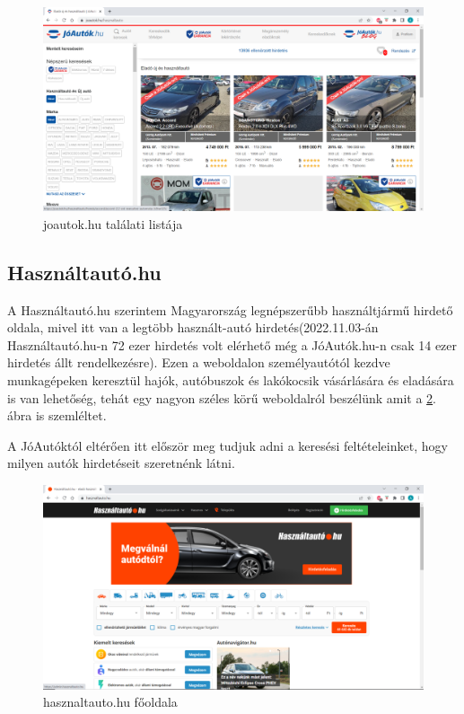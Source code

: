 \begin{figure}[h]
\centering
\includegraphics[scale=1]{images/joautok.png}
\caption{joautok.hu találati listája \cite{JoAuto}}
\label{fig:joautok}
\end{figure}

\subsection{Használtautó.hu}

A Használtautó.hu szerintem Magyarország legnépszerűbb használtjármű hirdető oldala, mivel itt van a legtöbb használt-autó hirdetés(2022.11.03-án Használtautó.hu-n 72 ezer hirdetés volt elérhető még a JóAutók.hu-n csak 14 ezer hirdetés állt rendelkezésre). Ezen a weboldalon személyautótól kezdve munkagépeken keresztül hajók, autóbuszok és lakókocsik vásárlására és eladására is van lehetőség, tehát egy nagyon széles körű weboldalról beszélünk amit a \ref{fig:hasznaltauto}. ábra is szemléltet.

A JóAutóktól eltérően itt először meg tudjuk adni a keresési feltételeinket, hogy milyen autók hirdetéseit szeretnénk látni.

\begin{figure}[h]
\centering
\includegraphics[scale=0.8]{images/hasznaltauto.png}
\caption{hasznaltauto.hu főoldala\cite{Hasznaltauto}}
\label{fig:hasznaltauto}
\end{figure}
\newpage

